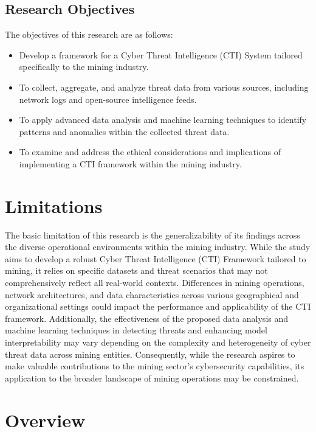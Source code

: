 \documentclass[a4paper,twoside,12pt]{report}
\begin{document}
\subsection{Research Objectives}

The objectives of this research are as follows:

\begin{itemize}
    \item Develop a framework for a Cyber Threat Intelligence (CTI) System tailored specifically to the mining industry.
    \item To collect, aggregate, and analyze threat data from various sources, including network logs and open-source intelligence feeds.
    \item To apply advanced data analysis and machine learning techniques to identify patterns and anomalies within the collected threat data.
    \item To examine and address the ethical considerations and implications of implementing a CTI framework within the mining industry.
\end{itemize}
\section{Limitations}
The basic limitation of this research is the generalizability of its findings across the diverse operational environments within the mining industry. While the study aims to develop a robust Cyber Threat Intelligence (CTI) Framework tailored to mining, it relies on specific datasets and threat scenarios that may not comprehensively reflect all real-world contexts. Differences in mining operations, network architectures, and data characteristics across various geographical and organizational settings could impact the performance and applicability of the CTI framework. Additionally, the effectiveness of the proposed data analysis and machine learning techniques in detecting threats and enhancing model interpretability may vary depending on the complexity and heterogeneity of cyber threat data across mining entities. Consequently, while the research aspires to make valuable contributions to the mining sector's cybersecurity capabilities, its application to the broader landscape of mining operations may be constrained.\\
\section{Overview}
\end{document}
